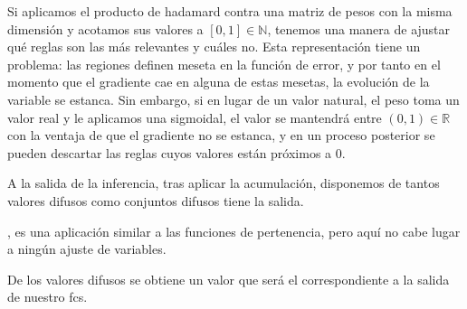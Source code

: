 Si aplicamos el producto de hadamard contra una matriz de pesos con la misma dimensión y acotamos sus valores a $[0, 1] \in \mathbb{N}$, tenemos una manera de ajustar qué reglas son las más relevantes y cuáles no. Esta representación tiene un problema: las regiones definen meseta en la función de error, y por tanto en el momento que el gradiente cae en alguna de estas mesetas, la evolución de la variable se estanca. Sin embargo, si en lugar de un valor natural, el peso toma un valor real y le aplicamos una sigmoidal, el valor se mantendrá entre $(0, 1) \in \mathbb{R}$ con la ventaja de que el gradiente no se estanca, y en un proceso posterior se pueden descartar las reglas cuyos valores están próximos a $0$.

A la salida de la inferencia, tras aplicar la acumulación, disponemos de tantos valores difusos como conjuntos difusos tiene la salida.

, es una aplicación similar a las funciones de pertenencia, pero aquí no cabe lugar a ningún ajuste de variables.

De los valores difusos se obtiene un valor que será el correspondiente a la salida de nuestro \ac{fcs}.